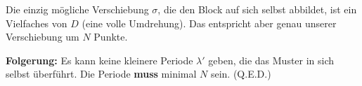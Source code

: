 \documentclass[11pt]{article}
\begin{document}
Die einzig mögliche Verschiebung $\sigma$, die den Block auf sich selbst abbildet, ist ein Vielfaches von $D$ (eine volle Umdrehung). Das entspricht aber genau unserer Verschiebung um $N$ Punkte. 

\textbf{Folgerung:} Es kann keine kleinere Periode $\lambda'$ geben, die das Muster in sich selbst überführt. Die Periode \textbf{muss} minimal $N$ sein. (Q.E.D.)
\end{document}
